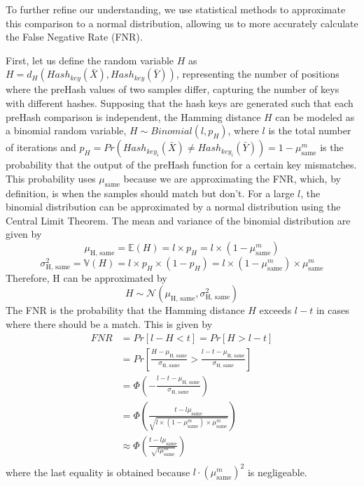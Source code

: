 To further refine our understanding, we use statistical methods to approximate this comparison to a normal distribution, allowing us to more accurately calculate the False Negative Rate (FNR). 

First, let us define the random variable $H$ as \(H = d_H(Hash_{key}(\bar{X}), Hash_{key}(\bar{Y}))\), representing the number of positions where the preHash values of two samples differ, capturing the number of keys with different hashes. Supposing that the hash keys are generated such that each preHash comparison is independent, the Hamming distance $H$ can be modeled as a binomial random variable, \(H \sim Binomial(l, p_H)\), where $l$ is the total number of iterations and $p_H = Pr(Hash_{key_i}(\bar{X}) \neq Hash_{key_i}(\bar{Y})) = 1 - \mu_{\text{same}}^m$ is the probability that the output of the preHash function for a certain key mismatches. This probability uses $\mu_{\text{same}}$ because we are approximating the FNR, which, by definition, is when the samples should match but don't. 
\newline For a large $l$, the binomial distribution can be approximated by a normal distribution using the Central Limit Theorem. The mean and variance of the binomial distribution are given by
\[
\mu_{\text{H, same}} = \mathbb{E}(H) = l \times p_H = l \times (1 - \mu_{\text{same}}^m)    
\]
\[
\sigma_{\text{H, same}}^2 = \mathbb{V}(H) = l \times p_H \times (1 - p_H) = l \times (1 - \mu_{\text{same}}^m) \times \mu_{\text{same}}^m    
\]
Therefore, H can be approximated by
\[
H \sim \mathcal{N}(\mu_{\text{H, same}}, \sigma_{\text{H, same}}^2)    
\]
The FNR is the probability that the Hamming distance $H$ exceeds $l - t$ in cases where there should be a match. This is given by
\begin{equation}
    \begin{aligned}
        \label{eq:fnr}
        FNR &= Pr[l - H < t] = Pr[H > l - t] \\
        &= Pr\left[\frac{H - \mu_{\text{H, same}}}{\sigma_{\text{H, same}}} > \frac{l - t - \mu_{\text{H, same}}}{\sigma_{\text{H, same}}}\right] \\
        &= \Phi \left( - \frac{l - t - \mu_{\text{H, same}}}{\sigma_{\text{H, same}}}\right) \\
        &= \Phi \left(\frac{t - l\mu_{\text{same}}}{\sqrt{l \times (1 - \mu_{\text{same}}^m) \times \mu_{\text{same}}^m}}\right) \\
        &\approx \Phi \left(\frac{t - l\mu_{\text{same}}}{\sqrt{l\mu_{\text{same}}^m}}\right) \\
    \end{aligned}        
\end{equation}
where the last equality is obtained because $l\cdot(\mu_{\text{same}}^m)^2$ is negligeable. 

